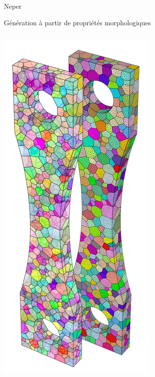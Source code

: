 \documentclass[11pt,aspectratio=1610]{beamer}
\begin{document}
\begin{frame}{Neper}
\begin{block}{Génération à partir de propriétés morphologiques \cite{Neper,Neper_Bimodal}}
\begin{columns}
\begin{column}{0.25\linewidth}
        \includegraphics[width=0.55\linewidth]{pngFigures/neper_bielle.png}
      \end{column}
      \begin{column}{0.25\linewidth}
        \centering

\end{column}
\end{columns}
\end{block}
\end{frame}
\end{document}

